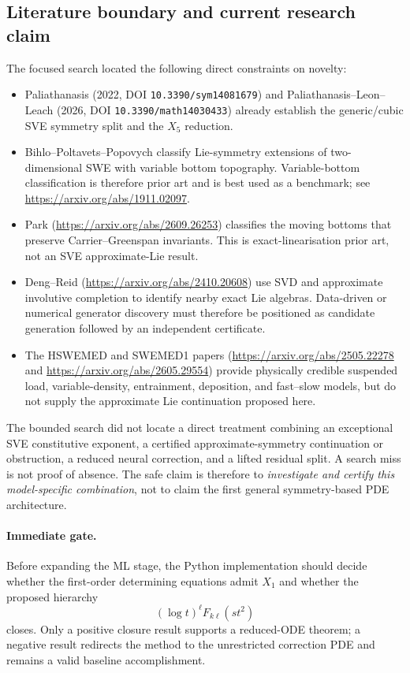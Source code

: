 \documentclass[11pt]{article}
\begin{document}
\subsection{Literature boundary and current research claim}

The focused search located the following direct constraints on novelty:
\begin{itemize}
\item Paliathanasis (2022, DOI \texttt{10.3390/sym14081679}) and
Paliathanasis--Leon--Leach (2026, DOI \texttt{10.3390/math14030433}) already
establish the generic/cubic SVE symmetry split and the $X_5$ reduction.
\item Bihlo--Poltavets--Popovych classify Lie-symmetry extensions of
two-dimensional SWE with variable bottom topography.  Variable-bottom
classification is therefore prior art and is best used as a benchmark; see
\url{https://arxiv.org/abs/1911.02097}.
\item Park (\url{https://arxiv.org/abs/2609.26253}) classifies the moving bottoms
that preserve Carrier--Greenspan invariants.  This is exact-linearisation prior
art, not an SVE approximate-Lie result.
\item Deng--Reid (\url{https://arxiv.org/abs/2410.20608}) use SVD and approximate
involutive completion to identify nearby exact Lie algebras.  Data-driven or
numerical generator discovery must therefore be positioned as candidate
generation followed by an independent certificate.
\item The HSWEMED and SWEMED1 papers
(\url{https://arxiv.org/abs/2505.22278} and
\url{https://arxiv.org/abs/2605.29554}) provide physically credible suspended
load, variable-density, entrainment, deposition, and fast--slow models, but do
not supply the approximate Lie continuation proposed here.
\end{itemize}

The bounded search did not locate a direct treatment combining an exceptional
SVE constitutive exponent, a certified approximate-symmetry continuation or
obstruction, a reduced neural correction, and a lifted residual split.  A search
miss is not proof of absence.  The safe claim is therefore to
\emph{investigate and certify this model-specific combination}, not to claim the
first general symmetry-based PDE architecture.

\paragraph{Immediate gate.}
Before expanding the ML stage, the Python implementation should decide whether
the first-order determining equations admit $X_1$ and whether the proposed
hierarchy
\[
 (\log t)^\ell F_{k\ell}(st^2)
\]
closes.  Only a positive closure result
supports a reduced-ODE theorem; a negative result redirects the method to the
unrestricted correction PDE and remains a valid baseline accomplishment.
\end{document}
